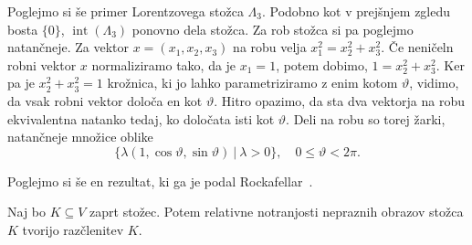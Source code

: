 \documentclass[mat2, tisk]{fmfdelo}
\begin{document}
\begin{zgled}
  Poglejmo si še primer Lorentzovega stožca $\Lambda_3$. 
  Podobno kot v prejšnjem zgledu bosta
  $\{0\}$, $\operatorname{int}(\Lambda_3)$ ponovno dela stožca.
  Za rob stožca si pa poglejmo natančneje. Za vektor $x = (x_1, x_2, x_3)$ na robu velja 
  $x_1^2 = x_2^2 + x_3^2$. Če neničeln robni vektor $x$ normaliziramo tako, da je $x_1 = 1$, potem dobimo,
  $1 = x_2^2 + x_3^2$. Ker pa je $x_2^2 + x_3^2 = 1$ krožnica, ki jo lahko parametriziramo 
  z enim kotom $\vartheta$, vidimo, da vsak robni vektor določa en kot $\vartheta$. 
  Hitro opazimo, da sta dva vektorja na robu ekvivalentna natanko tedaj, ko določata 
  isti kot $\vartheta$.
  Deli na robu so torej žarki, natančneje množice oblike
  \[  \{\lambda(1, \cos\vartheta, \sin\vartheta)~|~\lambda > 0\},
  \quad 0 \le \vartheta < 2\pi.  \]
\end{zgled}

Poglejmo si še en rezultat, ki ga je podal Rockafellar~\cite[izrek 18.2]{rockafellar}.
\begin{izrek}\label{rockafellar}
Naj bo $K\subseteq V$ zaprt stožec. Potem relativne notranjosti
nepraznih obrazov stožca $K$ tvorijo razčlenitev $K$.
\end{izrek}
\end{document}
